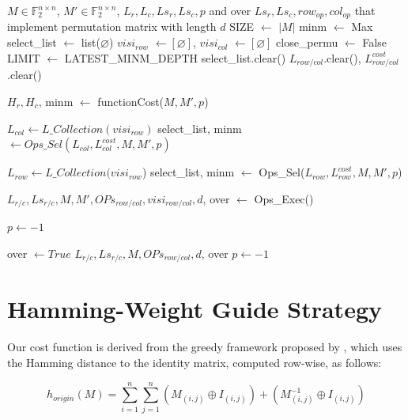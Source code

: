 \begin{algorithm}[htbp]
\caption{Row/Col Greedy}
\label{alg:Modified-Shi-Feng-Greedy}
\begin{algorithmic}[1]
\Require $M \in \mathbb{F}_{2}^{n \times n}$, $M' \in \mathbb{F}_{2}^{n \times n}$, $L_{r}, L_{c}, Ls_{r}, Ls_{c}, p$ and over
\Ensure $Ls_{r}, Ls_{c}, row_{op}, col_{op}$ that implement permutation matrix with length $d$
\State SIZE $\leftarrow$ $|M|$
\State minm $\leftarrow$ Max
\State select\_list $\leftarrow$ list($\varnothing$)
\State $visi_{row}$ $\leftarrow [\varnothing]$, $visi_{col}$ $\leftarrow [\varnothing]$
\State close\_permu $\leftarrow$ False
\State LIMIT $\leftarrow$ LATEST\_MINM\_DEPTH
	\State select\_list.clear()
	\State $L_{row/col}$.clear(), $L_{row/col}^{cost}$.clear()
	
	\State $H_{r}, H_{c}$, minm $\leftarrow$ functionCost($M, M', p$)
    
		\State $L_{col} \leftarrow L\_Collection(visi_{row})$
	    \State select\_list, minm $\leftarrow Ops\_Sel( L_{col}, L_{col}^{cost}, M, M', p)$ 
    \EndIf

	\State $L_{row} \leftarrow L\_Collection(visi_{row}$)
	\State select\_list, minm $\leftarrow$ Ops\_Sel($L_{row}, L_{row}^{cost}, M, M', p$)
    
	\State $L_{r/c}, Ls_{r/c}, M, M', OPs_{row/col}, visi_{row/col}, d$, over $\leftarrow$ Ops\_Exec()

		\State $p \leftarrow -1$
	\EndIf
    
	    \State over $\leftarrow True$ 
	    \State \Return
    \EndIf
\EndWhile
\State \Return $L_{r/c}, Ls_{r/c}, M, OPs_{row/col}, d$, over
	\State $p \leftarrow -1$
\EndIf
\end{algorithmic}
\end{algorithm}

\section{Hamming-Weight Guide Strategy}

Our cost function is derived from the greedy framework proposed by \cite{schaeffer2014cost}, which uses the Hamming distance to the identity matrix, computed row-wise, as follows:

\begin{equation}
	h_{origin}(M) = \sum_{i=1}^{n}\sum_{j=1}^{n}(M_{(i,j)} \oplus I_{(i,j)}) + (M^{-1}_{(i,j)} \oplus I_{(i,j)})
\end{equation}


